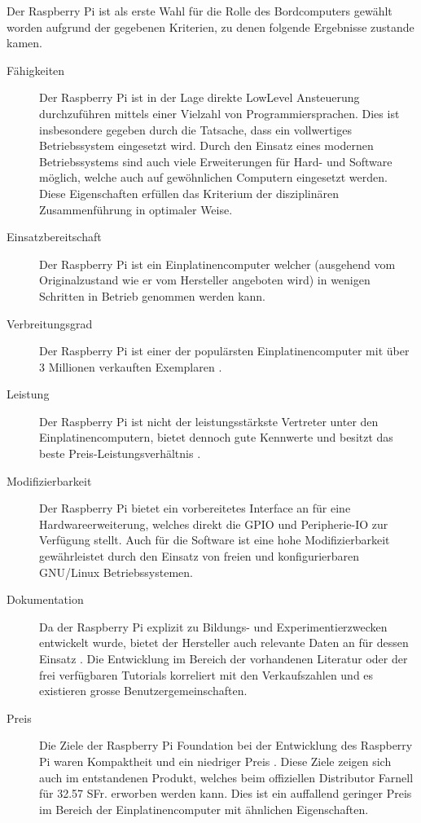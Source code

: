 Der Raspberry Pi ist als erste Wahl für die Rolle des Bordcomputers 
gewählt worden aufgrund der gegebenen Kriterien, zu denen folgende 
Ergebnisse zustande kamen.

\begin{description}
	\item[Fähigkeiten] Der Raspberry Pi ist in der Lage direkte
		LowLevel Ansteuerung durchzuführen mittels einer Vielzahl
		von Programmiersprachen. Dies ist insbesondere gegeben
		durch die Tatsache, dass ein vollwertiges Betriebssystem
		eingesetzt wird. Durch den Einsatz eines modernen
		Betriebssystems sind auch viele Erweiterungen für Hard- 
		und Software möglich, welche auch auf gewöhnlichen 
		Computern eingesetzt werden. Diese Eigenschaften erfüllen
		das Kriterium der disziplinären Zusammenführung in 
		optimaler Weise.
	\item[Einsatzbereitschaft] Der Raspberry Pi ist ein 
		Einplatinencomputer welcher (ausgehend vom Originalzustand
		wie er vom Hersteller angeboten wird) in wenigen Schritten 
		in Betrieb genommen werden kann. 
	\item[Verbreitungsgrad] Der Raspberry Pi ist einer der
		populärsten Einplatinencomputer mit über 3 Millionen
		verkauften Exemplaren \cite{liz}.
	\item[Leistung] Der Raspberry Pi ist nicht der leistungsstärkste
		Vertreter unter den Einplatinencomputern, bietet dennoch
		gute Kennwerte und besitzt das beste
		Preis-Leistungsverhältnis \cite{elv}.
	\item[Modifizierbarkeit] Der Raspberry Pi bietet ein vorbereitetes
		Interface an für eine Hardwareerweiterung, welches direkt
		die GPIO und Peripherie-IO zur Verfügung stellt. Auch
		für die Software ist eine hohe Modifizierbarkeit 
		gewährleistet durch den Einsatz von freien und 
		konfigurierbaren GNU/Linux Betriebssystemen.
	\item[Dokumentation] Da der Raspberry Pi explizit zu 
		Bildungs- und Experimentierzwecken entwickelt wurde, 
		bietet der Hersteller auch relevante Daten an für dessen
		Einsatz \cite{RPiSchematics}. Die Entwicklung im Bereich der
		vorhandenen Literatur oder der frei verfügbaren
		Tutorials korreliert mit den Verkaufszahlen und es 
		existieren grosse Benutzergemeinschaften.
	\item[Preis] Die Ziele der Raspberry Pi Foundation bei der
		Entwicklung des Raspberry Pi waren Kompaktheit und ein 
		niedriger Preis \cite{RPiFoundation}. Diese Ziele zeigen sich
		auch im entstandenen Produkt, welches beim offiziellen 
		Distributor Farnell für 32.57 SFr. erworben werden kann. Dies 
		ist ein auffallend geringer Preis im Bereich der 
		Einplatinencomputer mit ähnlichen Eigenschaften.
\end{description}

